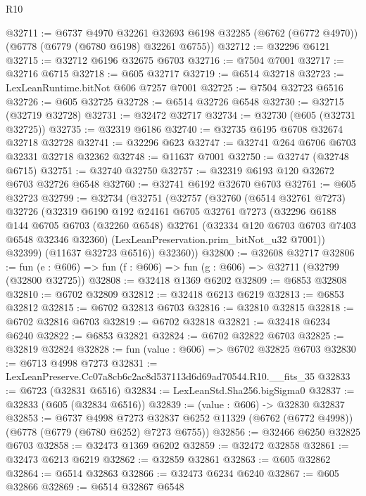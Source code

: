 \begin{lexlean}{R10}
\begin{coremodule}
@32711 := @6737
    @4970
    @32261
    @32693
    @6198
    @32285
    (@6762 (@6772 @4970))
    (@6778 (@6779 (@6780 @6198) @32261 @6755))
@32712 := @32296 @6121
@32715 := @32712 @6196 @32675 @6703
@32716 := @7504 @7001
@32717 := @32716 @6715
@32718 := @605 @32717
@32719 := @6514 @32718
@32723 := LexLeanRuntime.bitNot @606 @7257 @7001
@32725 := @7504 @32723 @6516
@32726 := @605 @32725
@32728 := @6514 @32726 @6548
@32730 := @32715 (@32719 @32728)
@32731 := @32472 @32717
@32734 := @32730 (@605 (@32731 @32725))
@32735 := @32319 @6186
@32740 := @32735 @6195 @6708 @32674 @32718 @32728
@32741 := @32296 @623
@32747 := @32741 @264 @6706 @6703 @32331 @32718 @32362
@32748 := @11637 @7001
@32750 := @32747 (@32748 @6715)
@32751 := @32740 @32750
@32757 := @32319 @6193 @120 @32672 @6703 @32726 @6548
@32760 := @32741 @6192 @32670 @6703
@32761 := @605 @32723
@32799 := @32734
    (@32751
      (@32757
        (@32760
          (@6514 @32761 @7273)
          @32726
          (@32319
            @6190
            @192
            @24161
            @6705
            @32761
            @7273
            (@32296
              @6188
              @144
              @6705
              @6703
              (@32260 @6548)
              @32761
              (@32334 @120 @6703 @6703 @7403 @6548 @32346 @32360)
              (LexLeanPreservation.prim_bitNot_u32 @7001))
            @32399)
          (@11637 @32723 @6516))
        @32360))
@32800 := @32608 @32717
@32806 := fun (e : @606) => fun (f : @606) => fun (g : @606) => @32711 (@32799 (@32800 @32725))
@32808 := @32418 @1369 @6202
@32809 := @6853 @32808
@32810 := @6702 @32809
@32812 := @32418 @6213 @6219
@32813 := @6853 @32812
@32815 := @6702 @32813 @6703
@32816 := @32810 @32815
@32818 := @6702 @32816 @6703
@32819 := @6702 @32818
@32821 := @32418 @6234 @6240
@32822 := @6853 @32821
@32824 := @6702 @32822 @6703
@32825 := @32819 @32824
@32828 := fun (value : @606) => @6702 @32825 @6703
@32830 := @6713 @4998 @7273
@32831 := LexLeanPreserve.Cc07a8cb6c2ac8d537113d6d69ad70544.R10.__fits_35
@32833 := @6723 (@32831 @6516)
@32834 := LexLeanStd.Sha256.bigSigma0
@32837 := @32833 (@605 (@32834 @6516))
@32839 := (value : @606) -> @32830 @32837
@32853 := @6737
    @4998
    @7273
    @32837
    @6252
    @11329
    (@6762 (@6772 @4998))
    (@6778 (@6779 (@6780 @6252) @7273 @6755))
@32856 := @32466 @6250 @32825 @6703
@32858 := @32473 @1369 @6202
@32859 := @32472 @32858
@32861 := @32473 @6213 @6219
@32862 := @32859 @32861
@32863 := @605 @32862
@32864 := @6514 @32863
@32866 := @32473 @6234 @6240
@32867 := @605 @32866
@32869 := @6514 @32867 @6548

\end{coremodule}
\end{lexlean}
